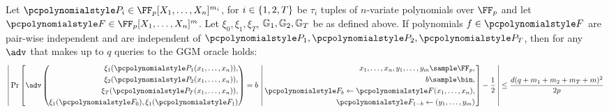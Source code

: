 \documentclass[runningheads,11pt]{llncs}
\begin{document}
\begin{theorem}
  \label{thm:uber_assumption}
  Let $\p{P}_i \in \FF_p[X_1, \ldots, X_n]^{m_i}$, for
  $i \in \{1, 2, T\}$ be $\tau_i$ tuples of $n$-variate polynomials over
  $\FF_p$ and let $\p{F} \in \FF_p[X_1, \ldots, X_n]^m$. Let
  $\xi_0, \xi_1, \xi_T$, $\mathbb{G}_1, \mathbb{G}_2, \mathbb{G}_T$ be as defined above. If
  polynomials $f \in \p{F}$ are pair-wise independent and are independent of
  $\p{P}_1, \p{P}_2, \p{P}_T$, then for any $\adv$ that makes up to $q$ queries to the
  GGM oracle holds:
  \[
    \left|\,
    \Pr\left[
    \adv\left(
      \begin{aligned}
        \xi_1(\p{P}_1(x_1, \ldots, x_n)), \\
        \xi_2(\p{P}_2(x_1, \ldots, x_n)), \\
        \xi_T(\p{P}_T(x_1, \ldots, x_n)), \\
        \xi_{1}(\p{F}_0), \xi_{1}(\p{F}_1)
      \end{aligned}
    \right) = b
    \, \left|\,
      \begin{aligned}
        x_1, \ldots, x_n, y_1, \ldots, y_m \sample \FF_p,\\
        b \sample \bin, \\
        \p{F}_b \gets \p{F}(x_1, \ldots, x_n),\\
        \p{F}_{1 - b} \gets (y_1, \ldots, y_m)
      \end{aligned}
    \right.  \right] - \frac{1}{2} \, \right| \leq \frac{d(q + m_1 + m_2 + m_T +
  m)^2 }{2p}
  \]
\end{theorem}
\end{document}

